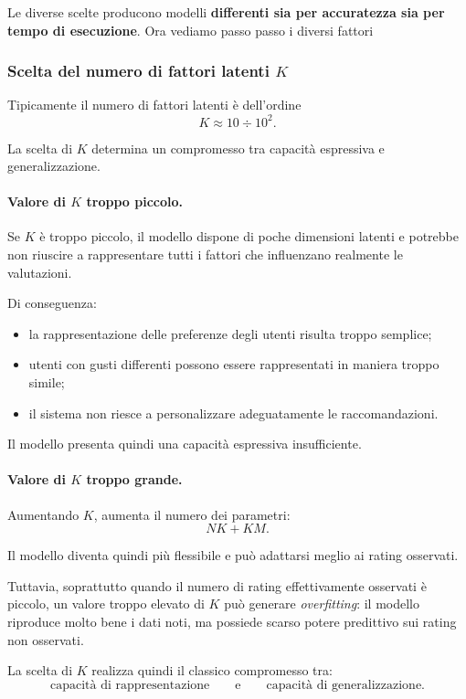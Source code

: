 Le diverse scelte producono modelli \textbf{differenti sia per accuratezza sia per tempo di esecuzione}.
Ora vediamo passo passo i diversi fattori

\subsubsection{Scelta del numero di fattori latenti $K$}

Tipicamente il numero di fattori latenti è dell'ordine
\[
K \approx 10 \div 10^{2}.
\]

La scelta di $K$ determina un compromesso tra capacità espressiva e generalizzazione.

\paragraph{Valore di $K$ troppo piccolo.}

Se $K$ è troppo piccolo, il modello dispone di poche dimensioni latenti e potrebbe non riuscire a rappresentare tutti i fattori che influenzano realmente le valutazioni.

Di conseguenza:
\begin{itemize}
    \item la rappresentazione delle preferenze degli utenti risulta troppo semplice;
    \item utenti con gusti differenti possono essere rappresentati in maniera troppo simile;
    \item il sistema non riesce a personalizzare adeguatamente le raccomandazioni.
\end{itemize}

Il modello presenta quindi una capacità espressiva insufficiente.

\paragraph{Valore di $K$ troppo grande.}

Aumentando $K$, aumenta il numero dei parametri:
\[
NK+KM.
\]

Il modello diventa quindi più flessibile e può adattarsi meglio ai rating osservati.

Tuttavia, soprattutto quando il numero di rating effettivamente osservati è piccolo, un valore troppo elevato di $K$ può generare \emph{overfitting}: il modello riproduce molto bene i dati noti, ma possiede scarso potere predittivo sui rating non osservati.

La scelta di $K$ realizza quindi il classico compromesso tra:
\[
\text{capacità di rappresentazione}
\qquad\text{e}\qquad
\text{capacità di generalizzazione}.
\]

